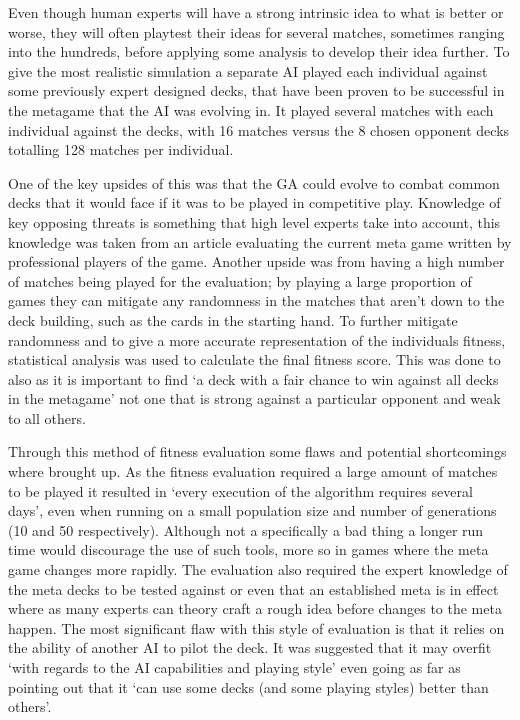 \documentclass[a4paper]{article}
\begin{document}
Even though human experts will have a strong intrinsic idea to what is better or worse, they will often playtest their ideas for several matches, sometimes ranging into the hundreds, before applying some analysis to develop their idea further.
To give the most realistic simulation a separate AI played each individual against some previously expert designed decks, that have been proven to be successful in the metagame that the AI was evolving in.
It played several matches with each individual against the decks, with 16 matches versus the 8 chosen opponent decks totalling 128 matches per individual\cite{hearthstoneAI}.
\par
One of the key upsides of this was that the GA could evolve to combat common decks that it would face if it was to be played in competitive play.
Knowledge of key opposing threats is something that high level experts take into account, this knowledge was taken from an article evaluating the current meta game written by professional players of the game.
Another upside was from having a high number of matches being played for the evaluation; by playing a large proportion of games they can mitigate any randomness in the matches that aren't down to the deck building, such as the cards in the starting hand.
To further mitigate randomness and to give a more accurate representation of the individuals fitness, statistical analysis was used to calculate the final fitness score.
This was done to also as it is important to find `a deck with a fair chance to win against all decks in the metagame' not one that is strong against a particular opponent and weak to all others.
\par
Through this method of fitness evaluation some flaws and potential shortcomings where brought up.
As the fitness evaluation required a large amount of matches to be played it resulted in `every execution of the algorithm requires several days'\cite{hearthstoneAI}, even when running on a small population size and number of generations (10 and 50 respectively).
Although not a specifically a bad thing a longer run time would discourage the use of such tools, more so in games where the meta game changes more rapidly.
The evaluation also required the expert knowledge of the meta decks to be tested against or even that an established meta is in effect where as many experts can theory craft a rough idea before changes to the meta happen.
The most significant flaw with this style of evaluation is that it relies on the ability of another AI to pilot the deck.
It was suggested that it may overfit `with regards to the AI capabilities and playing style' even going as far as pointing out that it `can use some decks (and some playing styles) better than others'\cite{hearthstoneAI}.
\end{document}
